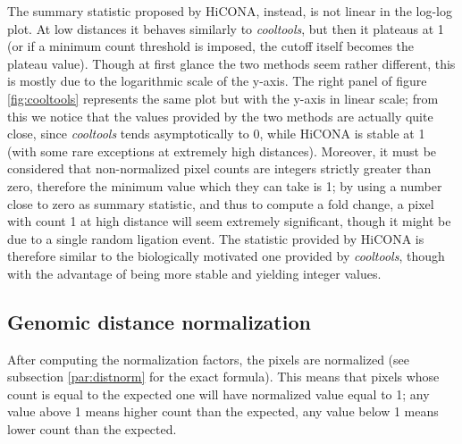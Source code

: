 The summary statistic proposed by HiCONA, instead, is not linear in the log-log plot. At low distances it behaves similarly to \textit{cooltools}, but then it plateaus at 1 (or if a minimum count threshold is imposed, the cutoff itself becomes the plateau value). Though at first glance the two methods seem rather different, this is mostly due to the logarithmic scale of the y-axis. The right panel of figure \ref{fig:cooltools} represents the same plot but with the y-axis in linear scale; from this we notice that the values provided by the two methods are actually quite close, since \textit{cooltools} tends asymptotically to 0, while HiCONA is stable at 1 (with some rare exceptions at extremely high distances). Moreover, it must be considered that non-normalized pixel counts are integers strictly greater than zero, therefore the minimum value which they can take is 1; by using a number close to zero as summary statistic, and thus to compute a fold change, a pixel with count 1 at high distance will seem extremely significant, though it might be due to a single random ligation event. The statistic provided by HiCONA is therefore similar to the biologically motivated one provided by \textit{cooltools}, though with the advantage of being more stable and yielding integer values.


\subsection{Genomic distance normalization}

After computing the normalization factors, the pixels are normalized (see subsection \ref{par:distnorm} for the exact formula). This means that pixels whose count is equal to the expected one will have normalized value equal to 1; any value above 1 means higher count than the expected, any value below 1 means lower count than the expected. 

